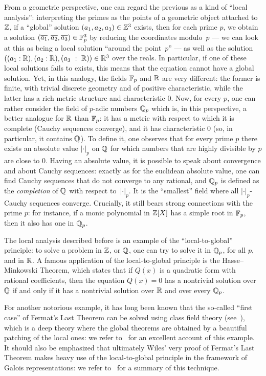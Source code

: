 \documentclass[sigplan,screen]{acmart}
\begin{document}
From a geometric perspective, one can regard the previous as a kind of ``local analysis'': interpreting the primes as the points of a geometric object attached to $\mathbb{Z}$, if a ``global'' solution $(a_1,a_2,a_3)\in\mathbb{Z}^3$ exists, then for each prime $p$, we obtain a solution $(\overline{a_1},\overline{a_2},\overline{a_3})\in\mathbb{F}_{p}^3$ by reducing the coordinates modulo~$p$ --- we can look at this as being a local solution ``around the point~$p$'' --- as well as the solution  $((a_1 : \mathbb{R}),(a_2 : \mathbb{R}),(a_3~:~\mathbb{R}))\in\mathbb{R}^3$ over the reals. In particular, if one of these local solutions fails to exists, this means that the equation cannot have a global solution. Yet, in this analogy, the fields $\mathbb{F}_{p}$ and $\mathbb{R}$ are very different: the former is finite, with trivial discrete geometry and of positive characteristic, while the latter has a rich metric structure and characteristic $0$. Now, for every $p$, one can rather consider the field of $p$-adic numbers $\mathbb{Q}_p$ which is, in this perspective, a better analogue for $\mathbb{R}$ than $\mathbb{F}_{p}$: it has a metric with respect to which it is complete (Cauchy sequences converge), and it has characteristic $0$ (so, in particular, it contains $\mathbb{Q}$). To define it, one observes that for every prime $p$ there exists an absolute value $\lvert\cdot\rvert_p$ on $\mathbb{Q}$ for which numbers that are highly divisible by $p$ are close to $0$. Having an absolute value, it is possible to speak about convergence and about Cauchy sequences: exactly as for the euclidean absolute value, one can find Cauchy sequences that do not converge to any rational, and $\mathbb{Q}_p$ is defined as the \emph{completion} of $\mathbb{Q}$ with respect to~$\lvert\cdot\rvert_p$. It is the ``smallest'' field where all $\lvert\cdot\rvert_p$-Cauchy sequences converge. Crucially, it still bears strong connections with the prime $p$: for instance, if a monic polynomial in $\mathbb{Z}[X]$ has a simple root in $\mathbb{F}_{p}$, then it also has one in $\mathbb{Q}_p$. 

The local analysis described before is an example of the ``local-to-global'' principle: to solve a problem in $\mathbb{Z}$, or $\mathbb{Q}$, one can try to solve it in $\mathbb{Q}_p$, for all $p$, and in $\mathbb{R}$. A famous application of the local-to-global principle is the Hasse–Minkowski Theorem, which states that if $Q(x)$ is a quadratic form with rational coefficients, then the equation $Q(x)=0$ has a nontrivial solution over $\mathbb{Q}$ if and only if it has a nontrivial solution over $\mathbb{R}$ and over every $\mathbb{Q}_p$.

For another notorious example, it has long been known that the so-called ``first case'' of Fermat's Last Theorem can be solved using class field theory (see~\cite{LenSte97}), which is a deep theory where the global theorems are obtained by a beautiful patching of the local ones: we refer to \cite{Tat67}~for an excellent account of this example. It should also be emphasized that ultimately Wiles' very proof of Fermat's Last Theorem makes heavy use of the local-to-global principle in the framework of Galois representations: we refer to~\cite{Fre09} for a summary of this technique.
\end{document}
